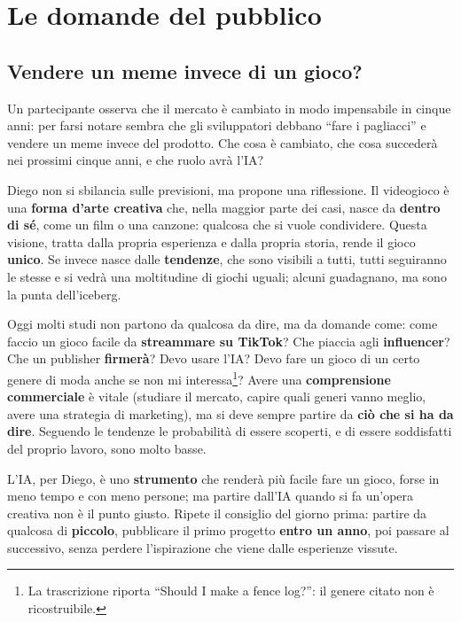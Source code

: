 \section{Le domande del pubblico}
\label{sec:c3-1-domande}

\subsection{Vendere un meme invece di un gioco?}

Un partecipante osserva che il mercato è cambiato in modo impensabile in cinque
anni: per farsi notare sembra che gli sviluppatori debbano ``fare i pagliacci'' e
vendere un meme invece del prodotto. Che cosa è cambiato, che cosa succederà nei
prossimi cinque anni, e che ruolo avrà l'IA?

Diego non si sbilancia sulle previsioni, ma propone una riflessione. Il videogioco è
una \textbf{forma d'arte creativa} che, nella maggior parte dei casi, nasce da
\textbf{dentro di sé}, come un film o una canzone: qualcosa che si vuole condividere.
Questa visione, tratta dalla propria esperienza e dalla propria storia, rende il
gioco \textbf{unico}. Se invece nasce dalle \textbf{tendenze}, che sono visibili a
tutti, tutti seguiranno le stesse e si vedrà una moltitudine di giochi uguali; alcuni
guadagnano, ma sono la punta dell'iceberg.

Oggi molti studi non partono da qualcosa da dire, ma da domande come: come faccio un
gioco facile da \textbf{streammare su TikTok}? Che piaccia agli
\textbf{influencer}? Che un publisher \textbf{firmerà}? Devo usare l'IA? Devo fare
un gioco di un certo genere di moda anche se non mi interessa\footnote{La
trascrizione riporta ``Should I make a fence log?'': il genere citato non è
ricostruibile.}? Avere una \textbf{comprensione commerciale} è vitale (studiare il
mercato, capire quali generi vanno meglio, avere una strategia di marketing), ma si
deve sempre partire da \textbf{ciò che si ha da dire}. Seguendo le tendenze le
probabilità di essere scoperti, e di essere soddisfatti del proprio lavoro, sono
molto basse.

L'IA, per Diego, è uno \textbf{strumento} che renderà più facile fare un gioco, forse
in meno tempo e con meno persone; ma partire dall'IA quando si fa un'opera creativa
non è il punto giusto. Ripete il consiglio del giorno prima: partire da qualcosa di
\textbf{piccolo}, pubblicare il primo progetto \textbf{entro un anno}, poi passare al
successivo, senza perdere l'ispirazione che viene dalle esperienze vissute.

